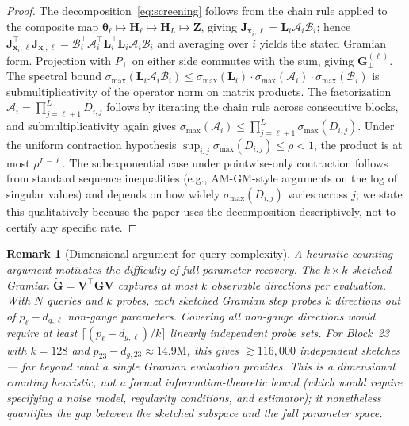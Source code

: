 \documentclass{article}
\newtheorem{remark}[theorem]{Remark}
\newcommand{\btheta}{\boldsymbol{\theta}}
\newcommand{\bx}{\mathbf{x}}
\newcommand{\bJ}{\mathbf{J}}
\newcommand{\bG}{\mathbf{G}}
\newcommand{\bV}{\mathbf{V}}
\newcommand{\bH}{\mathbf{H}}
\newcommand{\bZ}{\mathbf{Z}}
\newcommand{\bL}{\mathbf{L}}
\newcommand{\cA}{\mathcal{A}}
\newcommand{\cB}{\mathcal{B}}
\begin{document}
\begin{proof}
The decomposition~\eqref{eq:screening} follows from the chain rule applied to the composite map $\btheta_\ell \mapsto \bH_\ell \mapsto \bH_L \mapsto \bZ$, giving $\bJ_{\bx_i,\ell} = \bL_i \cA_i \cB_i$; hence $\bJ_{\bx_i,\ell}^\top \bJ_{\bx_i,\ell} = \cB_i^\top \cA_i^\top \bL_i^\top \bL_i \cA_i \cB_i$ and averaging over $i$ yields the stated Gramian form. Projection with $P_\perp$ on either side commutes with the sum, giving $\bG_\perp^{(\ell)}$. The spectral bound $\sigma_{\max}(\bL_i \cA_i \cB_i) \leq \sigma_{\max}(\bL_i) \cdot \sigma_{\max}(\cA_i) \cdot \sigma_{\max}(\cB_i)$ is submultiplicativity of the operator norm on matrix products. The factorization $\cA_i = \prod_{j=\ell+1}^{L} D_{i,j}$ follows by iterating the chain rule across consecutive blocks, and submultiplicativity again gives $\sigma_{\max}(\cA_i) \leq \prod_{j=\ell+1}^{L} \sigma_{\max}(D_{i,j})$. Under the uniform contraction hypothesis $\sup_{i,j} \sigma_{\max}(D_{i,j}) \leq \rho < 1$, the product is at most $\rho^{L-\ell}$. The subexponential case under pointwise-only contraction follows from standard sequence inequalities (e.g., AM-GM-style arguments on the log of singular values) and depends on how widely $\sigma_{\max}(D_{i,j})$ varies across $j$; we state this qualitatively because the paper uses the decomposition descriptively, not to certify any specific rate.
\end{proof}

\begin{remark}[Dimensional argument for query complexity]
\label{rem:fisher}
A heuristic counting argument motivates the difficulty of full parameter recovery. The $k \times k$ sketched Gramian $\tilde{\bG} = \bV^\top \bG \bV$ captures at most $k$ observable directions per evaluation. With $N$ queries and $k$ probes, each sketched Gramian step probes $k$ directions out of $p_\ell - d_{g,\ell}$ non-gauge parameters. Covering all non-gauge directions would require at least $\lceil(p_\ell - d_{g,\ell})/k\rceil$ linearly independent probe sets. For Block~23 with $k = 128$ and $p_{23} - d_{g,23} \approx 14.9\text{M}$, this gives $\gtrsim 116{,}000$ independent sketches --- far beyond what a single Gramian evaluation provides. This is a dimensional counting heuristic, not a formal information-theoretic bound (which would require specifying a noise model, regularity conditions, and estimator); it nonetheless quantifies the gap between the sketched subspace and the full parameter space.
\end{remark}
\end{document}
